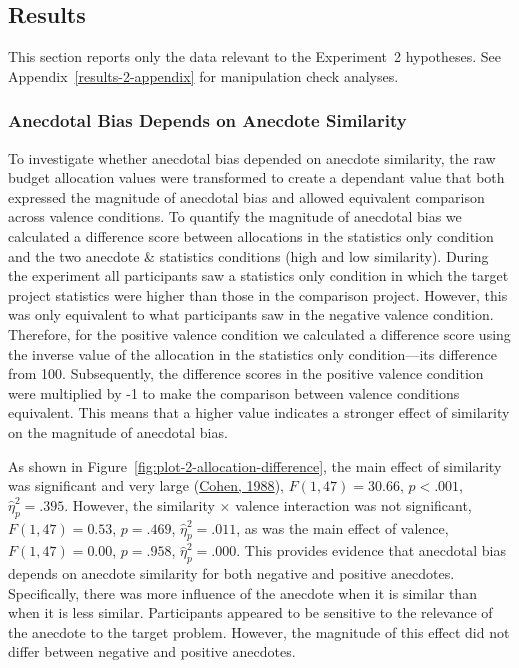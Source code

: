 \documentclass[
  man, donotrepeattitle,floatsintext]{apa7}
\theoremstyle{definition}
\theoremstyle{definition}
\theoremstyle{definition}
\theoremstyle{definition}
\theoremstyle{remark}
\begin{document}
\hypertarget{results}{%
\subsection{Results}\label{results}}

This section reports only the data relevant to the Experiment~2 hypotheses. See
Appendix~\ref{results-2-appendix} for manipulation check analyses.

\hypertarget{anecdotal-bias-depends-on-anecdote-similarity}{%
\subsubsection{Anecdotal Bias Depends on Anecdote Similarity}\label{anecdotal-bias-depends-on-anecdote-similarity}}

To investigate whether anecdotal bias depended on anecdote similarity, the raw
budget allocation values were transformed to create a dependant value that both
expressed the magnitude of anecdotal bias and allowed equivalent comparison
across valence conditions. To quantify the magnitude of anecdotal bias we
calculated a difference score between allocations in the statistics only
condition and the two anecdote \& statistics conditions (high and low
similarity). During the experiment all participants saw a statistics only
condition in which the target project statistics were higher than those in the
comparison project. However, this was only equivalent to what participants saw
in the negative valence condition. Therefore, for the positive valence condition
we calculated a difference score using the inverse value of the allocation in
the statistics only condition---its difference from 100. Subsequently, the
difference scores in the positive valence condition were multiplied by -1 to
make the comparison between valence conditions equivalent. This means that a
higher value indicates a stronger effect of similarity on the magnitude of
anecdotal bias.

As shown in Figure~\ref{fig:plot-2-allocation-difference}, the main
effect of similarity was significant and very large (\protect\hyperlink{ref-cohen1988}{Cohen, 1988}),
\(F(1, 47) = 30.66\), \(p < .001\), \(\hat{\eta}^2_p = .395\). However, the similarity \(\times\)
valence interaction was not significant,
\(F(1, 47) = 0.53\), \(p = .469\), \(\hat{\eta}^2_p = .011\), as was the main effect
of valence, \(F(1, 47) = 0.00\), \(p = .958\), \(\hat{\eta}^2_p = .000\). This provides evidence
that anecdotal bias depends on anecdote similarity for both negative and
positive anecdotes. Specifically, there was more influence of the anecdote when
it is similar than when it is less similar. Participants appeared to be
sensitive to the relevance of the anecdote to the target problem. However, the
magnitude of this effect did not differ between negative and positive anecdotes.
\end{document}
